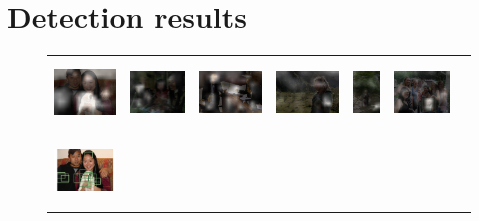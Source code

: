 \section{Detection results}
\label{sec:results:results}
\begin{figure}[htb]
    \setlength\tabcolsep{0pt}
    \renewcommand{\arraystretch}{0}
    \begin{tabular}{ccccccc}
      \includegraphics[height=1.8cm]{figures/hm_examples/1s_2008_002067} &
      \includegraphics[height=1.8cm]{figures/hm_examples/1s_2009_004323} &
      \includegraphics[height=1.8cm]{figures/hm_examples/1s_2009_004784} &
      \includegraphics[height=1.8cm]{figures/hm_examples/1s_2009_005222} &
      \includegraphics[height=1.8cm]{figures/hm_examples/1s_2009_002715} &
      \includegraphics[height=1.8cm]{figures/hm_examples/1s_2010_005967} \\
      \includegraphics[height=1.8cm]{figures/hm_examples/1s_bbox_2008_002067} &

\end{tabular}
\end{figure}
